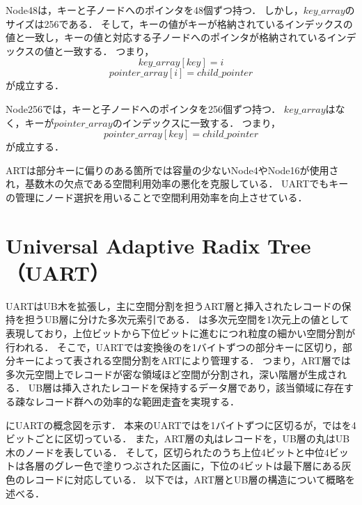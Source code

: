 Node48は，キーと子ノードへのポインタを48個ずつ持つ．
しかし，$key\_array$のサイズは256である．
そして，キーの値がキーが格納されているインデックスの値と一致し，キーの値と対応する子ノードへのポインタが格納されているインデックスの値と一致する．
つまり，
\[key\_array[key]=i\]
\[pointer\_array[i]=child\_pointer\]
が成立する．

Node256では，キーと子ノードへのポインタを256個ずつ持つ．
$key\_array$はなく，キーが$pointer\_array$のインデックスに一致する．
つまり，
\[pointer\_array[key]=child\_pointer\]
が成立する．

ARTは部分キーに偏りのある箇所では容量の少ないNode4やNode16が使用され，基数木の欠点である空間利用効率の悪化を克服している．
UARTでもキーの管理にノード選択を用いることで空間利用効率を向上させている．




\chapter{Universal Adaptive Radix Tree（UART）}

UARTはUB木を拡張し，主に空間分割を担うART層と挿入されたレコードの保持を担うUB層に分けた多次元索引である．
\ZCurve は多次元空間を1次元上の値として表現しており，上位ビットから下位ビットに進むにつれ粒度の細かい空間分割が行われる．
そこで，UARTでは変換後の\ZValue を1バイトずつの部分キーに区切り，部分キーによって表される空間分割をARTにより管理する．
つまり，ART層では多次元空間上でレコードが密な領域ほど空間が分割され，深い階層が生成される．
UB層は挿入されたレコードを保持するデータ層であり，該当領域に存在する疎なレコード群への効率的な範囲走査を実現する．

\Fig{\ref{fig:uart}}にUARTの概念図を示す．
本来のUARTでは\ZValue を1バイトずつに区切るが，\Fig{\ref{fig:uart}}では\ZValue を4ビットごとに区切っている．
また，ART層の丸はレコードを，UB層の丸はUB木のノードを表している．
そして，区切られた\ZValue のうち上位4ビットと中位4ビットは各層のグレー色で塗りつぶされた区画に，下位の4ビットは最下層にある灰色のレコードに対応している．
以下では，ART層とUB層の構造について概略を述べる．

